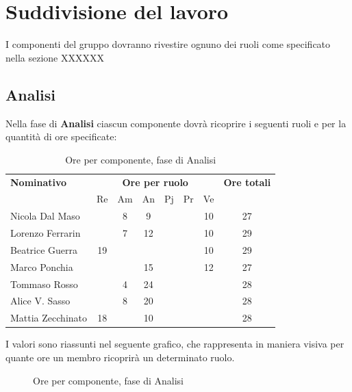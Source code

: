 \section{Suddivisione del lavoro}
I componenti del gruppo dovranno rivestire ognuno dei ruoli come specificato nella sezione XXXXXX
\subsection{Analisi}
Nella fase di \textbf{Analisi} ciascun componente dovrà ricoprire i seguenti ruoli e per la quantità di ore specificate:

\begin{table}[H]
\centering
\begin{tabular}{|l|c|c|c|c|c|c|c|}
\hline
\textbf{Nominativo} & 
\multicolumn{6}{c|}{\textbf{Ore per ruolo}} & 
\textbf{Ore totali} \\
& Re & Am & An & Pj & Pr & Ve & \\
\hline
Nicola Dal Maso & & 8 & 9 & & & 10 & 27 \\
Lorenzo Ferrarin & & 7 & 12 & & & 10 & 29 \\
Beatrice Guerra & 19 & & & & & 10 & 29 \\
Marco Ponchia & & & 15 & & & 12 & 27 \\
Tommaso Rosso & & 4 & 24 & & & & 28 \\
Alice V. Sasso & & 8 & 20 & & & & 28 \\
Mattia Zecchinato & 18 & & 10 & & & & 28 \\
\hline
\end{tabular}
\caption{Ore per componente, fase di Analisi}
\end{table}
I valori sono riassunti nel seguente grafico, che rappresenta in maniera visiva per quante ore un membro ricoprirà un determinato ruolo.
\begin{figure}[H]
\centering
{}
\caption{Ore per componente, fase di Analisi}
\end{figure}


